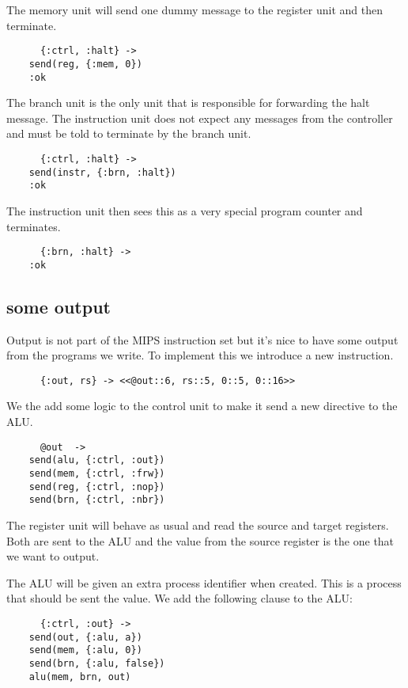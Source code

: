 \documentclass[a4paper,11pt]{article}
\begin{document}
The memory unit will send one dummy message to the register unit and then terminate.

\begin{verbatim}
      {:ctrl, :halt} ->
	send(reg, {:mem, 0})		
	:ok
\end{verbatim}

The branch unit is the only unit that is responsible for forwarding
the halt message. The instruction unit does not expect any messages
from the controller and must be told to terminate by the branch unit.

\begin{verbatim}
      {:ctrl, :halt} ->
	send(instr, {:brn, :halt})
	:ok
\end{verbatim}

The instruction unit then sees this as a very special program counter
and terminates.

\begin{verbatim}
      {:brn, :halt} ->
	:ok
\end{verbatim}

      
\subsection*{some output}

Output is not part of the MIPS instruction set but
it's nice to have some output from the programs we write. To
implement this we introduce a new instruction.

\begin{verbatim}
      {:out, rs} -> <<@out::6, rs::5, 0::5, 0::16>>
\end{verbatim}
    
We the add some logic to the control unit to make it send a new directive to the ALU. 

\begin{verbatim}
      @out  ->
	send(alu, {:ctrl, :out})
	send(mem, {:ctrl, :frw})
	send(reg, {:ctrl, :nop})
	send(brn, {:ctrl, :nbr})
\end{verbatim}

The register unit will behave as usual and read the source and target
registers. Both are sent to the ALU and the value from the source
register is the one that we want to output.


The ALU will be given an extra process identifier when created. This
is a process that should be sent the value. We add the following clause to the ALU:

\begin{verbatim}
      {:ctrl, :out} ->
	send(out, {:alu, a})
	send(mem, {:alu, 0})
	send(brn, {:alu, false})
	alu(mem, brn, out)
\end{verbatim}
\end{document}
